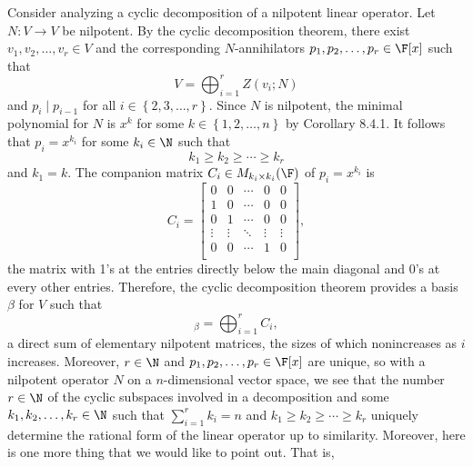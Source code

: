 \documentclass[linearalgebra]{subfiles}
\begin{document}
    \begin{remark}
        Consider analyzing a cyclic decomposition of a nilpotent linear operator. Let $N:V\to V$ be nilpotent. By the cyclic decomposition theorem, there exist $v_1, v_2, \ldots,v_r\in V$ and the corresponding $N$-annihilators $p_1,p_2,\ldots,p_r\in\F[x]$ such that
        \begin{equation*}
            V = \bigoplus^{r}_{i=1} Z\left( v_i;N \right) 
        \end{equation*}
        and $p_i\mid p_{i-1}$ for all $i\in \left\lbrace 2,3,\ldots,r \right\rbrace$. Since $N$ is nilpotent, the minimal polynomial for $N$ is $x^k$ for some $k\in \left\lbrace 1,2,\ldots,n \right\rbrace$ by Corollary 8.4.1. It follows that $p_i = x^{k_i}$ for some $k_i\in\N$ such that
        \begin{equation*}
            k_1\geq k_2\geq\cdots\geq k_r
        \end{equation*}
        and $k_1=k$. The companion matrix $C_i\in M_{k_i\times k_i}(\F)$ of $p_i=x^{k_i}$ is
        \begin{equation*}
            C_i = 
            \begin{bmatrix}
                0 & 0 & \cdots & 0 & 0 \\
                1 & 0 & \cdots & 0 & 0 \\
                0 & 1 & \cdots & 0 & 0 \\
                \vdots & \vdots & \ddots & \vdots & \vdots \\
                0 & 0 & \cdots & 1 & 0 \\
            \end{bmatrix},
        \end{equation*}
        the matrix with 1's at the entries directly below the main diagonal and 0's at every other entries. Therefore, the cyclic decomposition theorem provides a basis $\beta$ for $V$ such that
        \begin{equation*}
            [N]_\beta = \bigoplus^{r}_{i=1} C_i,
        \end{equation*}
        a direct sum of elementary nilpotent matrices, the sizes of which nonincreases as $i$ increases. Moreover, $r\in\N$ and $p_1,p_2,\ldots,p_r\in\F[x]$ are unique, so with a nilpotent operator $N$ on a $n$-dimensional vector space, we see that the number $r\in\N$ of the cyclic subspaces involved in a decomposition and some $k_1,k_2,\ldots,k_r\in\N$ such that $\sum^{r}_{i=1} k_i=n$ and $k_1\geq k_2\geq \cdots\geq k_r$ uniquely determine the rational form of the linear operator up to similarity. Moreover, here is one more thing that we would like to point out. That is,

\end{remark}
\end{document}
